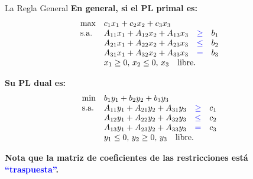 \documentclass{beamer}
\begin{document}
\begin{frame}{La Regla General}
    \textbf{En general, si el PL primal es:}
    \[
    \begin{array}{lll}
    \text{max} & c_1x_1 + c_2x_2 + c_3x_3 & \\
    \text{s.a.} & A_{11}x_1 + A_{12}x_2 + A_{13}x_3 \quad \text{\textcolor{blue}{$\geq$}} \quad b_1 & \\
    & A_{21}x_1 + A_{22}x_2 + A_{23}x_3 \quad \text{\textcolor{blue}{$\leq$}} \quad b_2 & \\
    & A_{31}x_1 + A_{32}x_2 + A_{33}x_3 \quad \text{\textcolor{blue}{$=$}} \quad b_3 & \\
    & x_1 \geq 0, \, x_2 \leq 0, \, x_3 \quad \text{libre}. &
    \end{array}
    \]

    \vspace{0.3cm}
    \textbf{Su PL dual es:}
    \[
    \begin{array}{lll}
    \text{min} & b_1y_1 + b_2y_2 + b_3y_3 & \\
    \text{s.a.} & A_{11}y_1 + A_{21}y_2 + A_{31}y_3 \quad \text{\textcolor{blue}{$\geq$}} \quad c_1 & \\
    & A_{12}y_1 + A_{22}y_2 + A_{32}y_3 \quad \text{\textcolor{blue}{$\leq$}} \quad c_2 & \\
    & A_{13}y_1 + A_{23}y_2 + A_{33}y_3 \quad \text{\textcolor{blue}{$=$}} \quad c_3 & \\
    & y_1 \leq 0, \, y_2 \geq 0, \, y_3 \quad \text{libre}. &
    \end{array}
    \]

    \vspace{0.3cm}
    \textbf{Nota que la matriz de coeficientes de las restricciones está \textcolor{blue}{“traspuesta”}.}
\end{frame}
\end{document}
